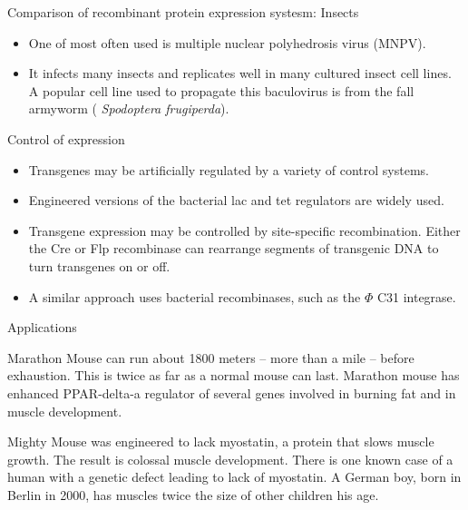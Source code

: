 \documentclass[ignorenonframetext,aspectratio=169]{beamer}
\providecommand{\tightlist}{%
  \setlength{\itemsep}{0pt}\setlength{\parskip}{0pt}}
\begin{document}
\begin{frame}{Comparison of recombinant protein expression systesm:
Insects}
\protect\hypertarget{comparison-of-recombinant-protein-expression-systesm-insects-1}{}

\begin{itemize}
\tightlist
\item
  One of most often used is multiple nuclear polyhedrosis virus (MNPV).
\item
  It infects many insects and replicates well in many cultured insect
  cell lines. A popular cell line used to propagate this baculovirus is
  from the fall armyworm ( \emph{Spodoptera frugiperda}).
\end{itemize}

\end{frame}

\begin{frame}{Control of expression}
\protect\hypertarget{control-of-expression}{}

\begin{itemize}
\tightlist
\item
  Transgenes may be artificially regulated by a variety of control
  systems.
\item
  Engineered versions of the bacterial lac and tet regulators are widely
  used.
\item
  Transgene expression may be controlled by site-specific recombination.
  Either the Cre or Flp recombinase can rearrange segments of transgenic
  DNA to turn transgenes on or off.
\item
  A similar approach uses bacterial recombinases, such as the \(\Phi\)
  C31 integrase.
\end{itemize}

\end{frame}

\begin{frame}{Applications}
\protect\hypertarget{applications}{}

Marathon Mouse can run about 1800 meters -- more than a mile -- before
exhaustion. This is twice as far as a normal mouse can last. Marathon
mouse has enhanced PPAR-delta-a regulator of several genes involved in
burning fat and in muscle development.

Mighty Mouse was engineered to lack myostatin, a protein that slows
muscle growth. The result is colossal muscle development. There is one
known case of a human with a genetic defect leading to lack of
myostatin. A German boy, born in Berlin in 2000, has muscles twice the
size of other children his age.

\end{frame}
\end{document}
